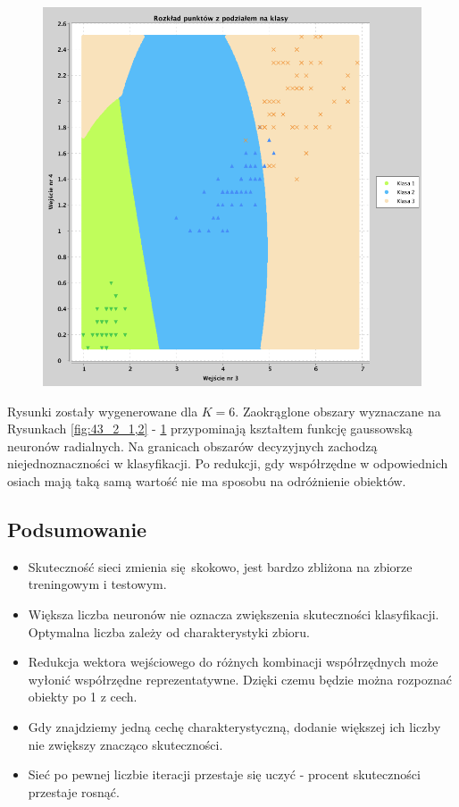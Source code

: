 \documentclass[a4paper, portrait,11pt]{article}
\begin{document}
\begin{figure}[!htb]
\begin{minipage}{0.33\textwidth}
    \caption{\label{fig:43_2_2,4}}
  \end{minipage}
  \begin{minipage}{0.33\textwidth}
    \centering
    \includegraphics[width=1\linewidth]{../data/classification4/3/2_3,4.png}
    \caption{\label{fig:43_2_3,4}}
  \end{minipage}\hfill
\end{figure}

Rysunki zostały wygenerowane dla $K=6$. Zaokrąglone obszary wyznaczane na Rysunkach \ref{fig:43_2_1,2} - \ref{fig:43_2_3,4}
przypominają kształtem funkcję gaussowską neuronów radialnych.
Na granicach obszarów decyzyjnych zachodzą niejednoznaczności w klasyfikacji.
Po redukcji, gdy współrzędne w odpowiednich osiach mają taką samą wartość nie ma sposobu na odróżnienie obiektów.

\subsection{Podsumowanie}
\begin{itemize}
  \item Skuteczność sieci zmienia się skokowo, jest bardzo zbliżona na zbiorze treningowym i testowym.
  \item Większa liczba neuronów nie oznacza zwiększenia skuteczności klasyfikacji. Optymalna liczba zależy od charakterystyki zbioru.
  \item Redukcja wektora wejściowego do różnych kombinacji współrzędnych może wyłonić współrzędne reprezentatywne. Dzięki czemu będzie można rozpoznać obiekty po 1 z cech.
  \item Gdy znajdziemy jedną cechę charakterystyczną, dodanie większej ich liczby nie zwiększy znacząco skuteczności.
  \item Sieć po pewnej liczbie iteracji przestaje się uczyć - procent skuteczności przestaje rosnąć.
\end{itemize}
\end{document}
